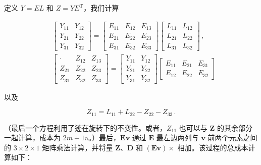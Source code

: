 \documentclass[10pt,a4paper]{book}
\theoremstyle{thmstyle} %
\theoremstyle{defstyle} %
\theoremstyle{prostyle} %
\begin{document}
定义 $Y = EL$ 和 $Z = YE^{\mathrm{T}}$，我们计算



$$
\begin{array}{rl} & { \left[ \begin{array}{lll} { Y _ { 11 } } & { Y _ { 12 } } \\{ Y _ { 21 } } & { Y _ { 22 } } \\{ Y _ { 31 } } & { Y _ { 32 } } \end{array} \right] = \left[ \begin{array}{lll} { E _ { 11 } } & { E _ { 12 } } & { E _ { 13 } } \\{ E _ { 21 } } & { E _ { 22 } } & { E _ { 23 } } \\{ E _ { 31 } } & { E _ { 32 } } & { E _ { 33 } } \end{array} \right] \left[ \begin{array}{ll} { L _ { 11 } } & { L _ { 12 } } \\{ L _ { 21 } } & { L _ { 22 } } \\{ L _ { 31 } } & { L _ { 32 } } \end{array} \right] \, , } \\& { \left[ \begin{array}{lll} { \cdot } & { Z _ { 12 } } & { Z _ { 13 } } \\{ Z _ { 21 } } & { Z _ { 22 } } & { Z _ { 23 } } \\{ Z _ { 31 } } & { Z _ { 32 } } & { Z _ { 33 } } \end{array} \right] = \left[ \begin{array}{ll} { Y _ { 11 } } & { Y _ { 12 } } \\{ Y _ { 21 } } & { Y _ { 22 } } \\{ Y _ { 31 } } & { Y _ { 32 } } \end{array} \right] \left[ \begin{array}{lll} { E _ { 11 } } & { E _ { 21 } } & { E _ { 31 } } \\{ E _ { 12 } } & { E _ { 22 } } & { E _ { 32 } } \end{array} \right] } \end{array}
$$



以及



$$
Z _ { 11 } = L _ { 11 } + L _ { 22 } - Z _ { 22 } - Z _ { 33 } \, .
$$



（最后一个方程利用了迹在旋转下的不变性。或者，$Z_{11}$ 也可以与 $\mathbf{Z}$ 的其余部分一起计算，成本为 $2m+1$a。）最后，$\mathbf{E}\boldsymbol{v}$ 通过 $\boldsymbol{E}$ 最左边两列与 $\boldsymbol{v}$ 前两个元素之间的 $3\times2\times1$ 矩阵乘法计算，并将量 $\mathbf{Z}$、$\boldsymbol{D}$ 和 $(\boldsymbol{E}\boldsymbol{v})\times$ 相加。该过程的总成本计算如下：
\end{document}
